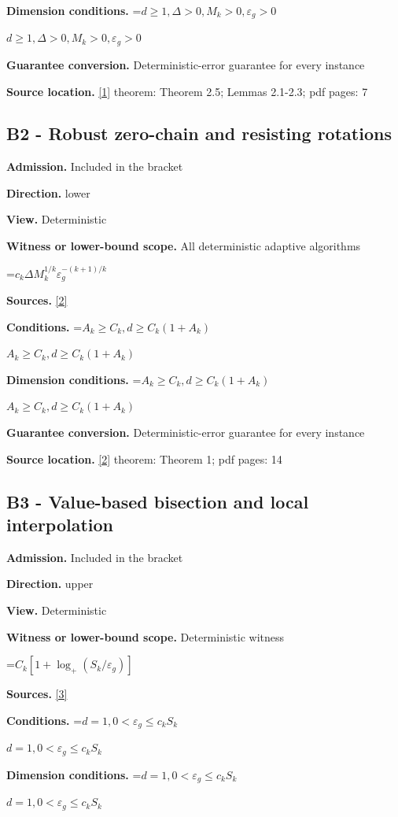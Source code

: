\documentclass[10pt,a4paper]{article}
\newcommand{\AtlasMath}[1]{\par\begingroup\centering\setbox0=\hbox{$\displaystyle #1$}\ifdim\wd0>1.4\linewidth\typeout{ATLAS WIDE FORMULA: \the\wd0}\fi\ifdim\wd0>\linewidth\resizebox{\linewidth}{!}{\box0}\else\box0\fi\par\endgroup}
\newcommand{\AtlasInlineMath}[1]{\begingroup\setbox0=\hbox{$#1$}\ifdim\wd0>.4\linewidth\endgroup\AtlasMath{#1}\else\endgroup$#1$\fi}
\begin{document}
\textbf{Dimension conditions.} \AtlasInlineMath{d\ge 1, \Delta>0, M_k>0, \varepsilon_g>0}

\textbf{Guarantee conversion.} Deterministic-error guarantee for every instance

\textbf{Source location.} \href{https://optimization-online.org/wp-content/uploads/2015/06/4970.pdf}{[1]} theorem: Theorem 2.5; Lemmas 2.1-2.3; pdf pages: 7

\subsection{B2 - Robust zero-chain and resisting rotations}
\textbf{Admission.} Included in the bracket

\textbf{Direction.} lower

\textbf{View.} Deterministic

\textbf{Witness or lower-bound scope.} All deterministic adaptive algorithms

\AtlasMath{c_k\Delta M_k^{1/k}\varepsilon_g^{-(k+1)/k}}
\textbf{Sources.} \href{https://arxiv.org/abs/1710.11606}{[2]}

\textbf{Conditions.} \AtlasInlineMath{A_k\ge C_k, d\ge C_k(1+A_k)}

\textbf{Dimension conditions.} \AtlasInlineMath{A_k\ge C_k, d\ge C_k(1+A_k)}

\textbf{Guarantee conversion.} Deterministic-error guarantee for every instance

\textbf{Source location.} \href{https://arxiv.org/abs/1710.11606}{[2]} theorem: Theorem 1; pdf pages: 14

\subsection{B3 - Value-based bisection and local interpolation}
\textbf{Admission.} Included in the bracket

\textbf{Direction.} upper

\textbf{View.} Deterministic

\textbf{Witness or lower-bound scope.} Deterministic witness

\AtlasMath{C_k[1+\log_+(S_k/\varepsilon_g)]}
\textbf{Sources.} \href{https://arxiv.org/abs/2610.16295}{[3]}

\textbf{Conditions.} \AtlasInlineMath{d=1, 0<\varepsilon_g\le c_k S_k}

\textbf{Dimension conditions.} \AtlasInlineMath{d=1, 0<\varepsilon_g\le c_k S_k}
\end{document}
